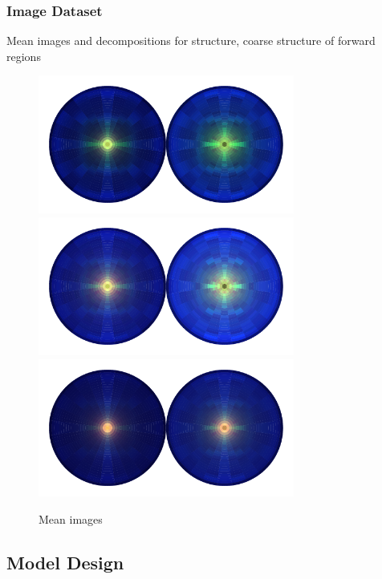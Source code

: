 \subsubsection{Image Dataset}
Mean images and decompositions for structure, coarse structure of forward regions
\begin{figure}[h!]
    \includegraphics[width=0.75\textwidth]{figures/event_selection/mean_vbf_PS_uw.pdf}
    \includegraphics[width=0.75\textwidth]{figures/event_selection/mean_ggh_PS_uw.pdf}
    \includegraphics[width=0.75\textwidth]{figures/event_selection/mean_bkg_PS_uw.pdf}
    \caption{Mean images}
    \label{fig:event_categorisation:mean_jet_image}
\end{figure}



\subsection{Model Design}


